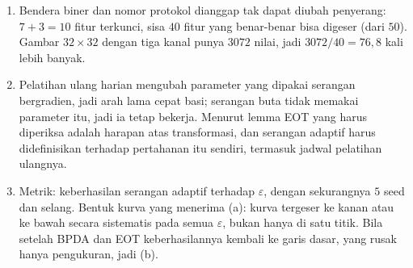 \begin{enumerate}[label=\textbf{30.\arabic*}]
  \item Bendera biner dan nomor protokol dianggap tak dapat diubah penyerang:
        $7+3=10$ fitur terkunci, sisa $40$ fitur yang benar-benar bisa digeser (dari
        $50$). Gambar $32\times32$ dengan tiga kanal punya $3072$ nilai, jadi
        $3072/40=76{,}8$ kali lebih banyak.

  \item Pelatihan ulang harian mengubah parameter yang dipakai serangan bergradien,
        jadi arah lama cepat basi; serangan buta tidak memakai parameter itu, jadi
        ia tetap bekerja. Menurut lemma EOT yang harus diperiksa adalah harapan atas
        transformasi, dan serangan adaptif harus didefinisikan terhadap pertahanan
        itu sendiri, termasuk jadwal pelatihan ulangnya.

  \item Metrik: keberhasilan serangan adaptif terhadap $\varepsilon$, dengan
        sekurangnya $5$ seed dan selang. Bentuk kurva yang menerima (a): kurva
        tergeser ke kanan atau ke bawah secara sistematis pada semua $\varepsilon$,
        bukan hanya di satu titik. Bila setelah BPDA dan EOT keberhasilannya kembali
        ke garis dasar, yang rusak hanya pengukuran, jadi (b).
\end{enumerate}

